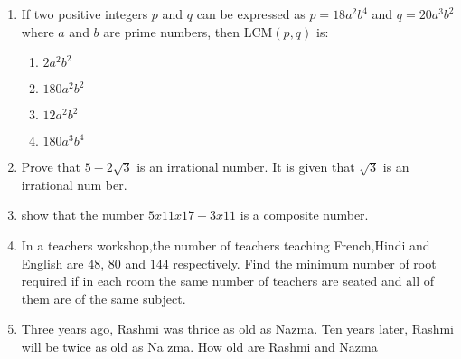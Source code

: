 \begin{enumerate}
\item If two positive integers $p$ and $q$ can be expressed as $p = 18a^2 b^4$ and $q = 20a^3 b^2$ where $a$ and $b$ are prime numbers, then $\text{LCM}(p, q)$ is:
	\begin{enumerate}    
\item $2a^2 b^2$
    \item $180a^2 b^2$
    \item $12a^2  b^2$
    \item $180a^3 b^4$
	\end{enumerate}

\item Prove that $ 5 - 2\sqrt{3}$ is an irrational number. It is given that $\sqrt{3}$  is an irrational num
ber.
\item show that the number $5x11x17+3x11$ is a composite number.  
\item In a teachers workshop,the number of teachers teaching French,Hindi and English are $48$, $80$ and $14
4$ respectively. Find the minimum number of root required if in each room the same number of teachers are seated and all of them are of the same subject. 
\item Three years ago, Rashmi was thrice as old as Nazma. Ten years later, Rashmi will be twice as old as Na
zma. How old are Rashmi and Nazma 

\end{enumerate}
